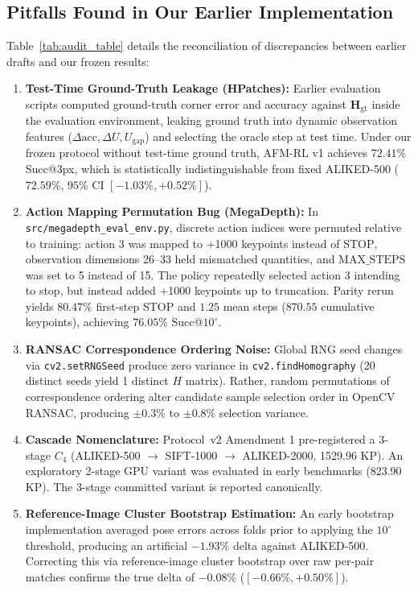 \documentclass[conference]{IEEEtran}
\begin{document}
\subsection{Pitfalls Found in Our Earlier Implementation}
Table~\ref{tab:audit_table} details the reconciliation of discrepancies between earlier drafts and our frozen results:
\begin{enumerate}
    \item \textbf{Test-Time Ground-Truth Leakage (HPatches):} Earlier evaluation scripts computed ground-truth corner error and accuracy against $\mathbf{H}_{\text{gt}}$ inside the evaluation environment, leaking ground truth into dynamic observation features ($\Delta\text{acc}, \Delta U, U_{\text{gap}}$) and selecting the oracle step at test time. Under our frozen protocol without test-time ground truth, AFM-RL v1 achieves $72.41\%$ Succ@3px, which is statistically indistinguishable from fixed ALIKED-500 ($72.59\%$, $95\%$ CI $[-1.03\%, +0.52\%]$).
    \item \textbf{Action Mapping Permutation Bug (MegaDepth):} In \texttt{src/megadepth\_eval\_env.py}, discrete action indices were permuted relative to training: action 3 was mapped to +1000 keypoints instead of $\mathrm{STOP}$, observation dimensions 26--33 held mismatched quantities, and $\text{MAX\_STEPS}$ was set to 5 instead of 15. The policy repeatedly selected action 3 intending to stop, but instead added +1000 keypoints up to truncation. Parity rerun yields $80.47\%$ first-step STOP and $1.25$ mean steps ($870.55$ cumulative keypoints), achieving $76.05\%$ Succ@$10^\circ$.
    \item \textbf{RANSAC Correspondence Ordering Noise:} Global RNG seed changes via \texttt{cv2.setRNGSeed} produce zero variance in \texttt{cv2.findHomography} (20 distinct seeds yield 1 distinct $H$ matrix). Rather, random permutations of correspondence ordering alter candidate sample selection order in OpenCV RANSAC, producing $\pm 0.3\%$ to $\pm 0.8\%$ selection variance.
    \item \textbf{Cascade Nomenclature:} Protocol~v2 Amendment 1 pre-registered a 3-stage $C_4$ (ALIKED-500 $\to$ SIFT-1000 $\to$ ALIKED-2000, 1529.96 KP). An exploratory 2-stage GPU variant was evaluated in early benchmarks (823.90 KP). The 3-stage committed variant is reported canonically.
    \item \textbf{Reference-Image Cluster Bootstrap Estimation:} An early bootstrap implementation averaged pose errors across folds prior to applying the $10^\circ$ threshold, producing an artificial $-1.93\%$ delta against ALIKED-500. Correcting this via reference-image cluster bootstrap over raw per-pair matches confirms the true delta of $-0.08\%$ ($[-0.66\%, +0.50\%]$).
\end{enumerate}
\end{document}
